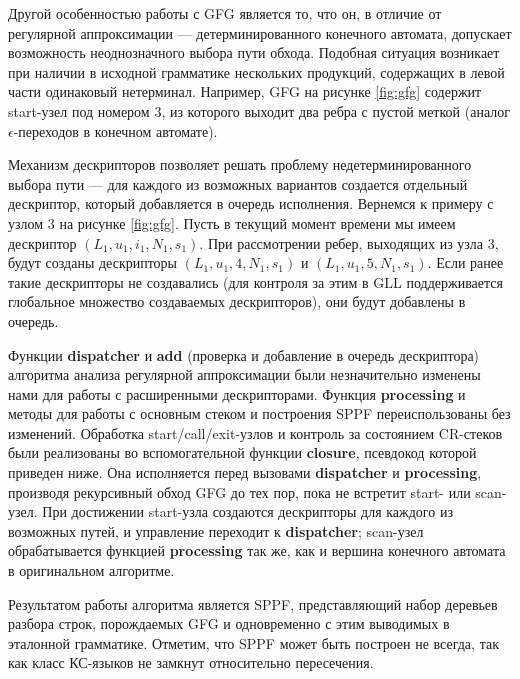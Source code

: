 Другой особенностью работы с GFG является то, что он, в отличие от регулярной аппроксимации --- детерминированного конечного автомата, допускает возможность неоднозначного выбора пути обхода. 
Подобная ситуация возникает при наличии в исходной грамматике нескольких продукций, содержащих в левой части одинаковый нетерминал. 
Например, GFG на рисунке \ref{fig:gfg} содержит start-узел под номером 3, из которого выходит два ребра с пустой меткой (аналог $\epsilon$-переходов в конечном автомате).

Механизм дескрипторов позволяет решать проблему недетерминированного выбора пути --- для каждого из возможных вариантов создается отдельный дескриптор, который добавляется в очередь исполнения. 
Вернемся к примеру с узлом 3 на рисунке \ref{fig:gfg}. Пусть в текущий момент времени мы имеем дескриптор $(L_1, u_1, i_1, N_1, s_1)$. 
При рассмотрении ребер, выходящих из узла 3, будут созданы дескрипторы $(L_1, u_1, 4, N_1, s_1)$ и $(L_1, u_1, 5, N_1, s_1)$. Если ранее такие дескрипторы не создавались (для контроля за этим в GLL поддерживается глобальное множество создаваемых дескрипторов), они будут добавлены в очередь.

Функции \textbf{dispatcher} и \textbf{add} (проверка и добавление в очередь дескриптора) алгоритма анализа регулярной аппроксимации были незначительно изменены нами для работы с расширенными дескрипторами. 
Функция \textbf{processing} и методы для работы с основным стеком и построения SPPF переиспользованы без изменений.
Обработка start/call/exit-узлов и контроль за состоянием CR-стеков были реализованы во вспомогательной функции \textbf{closure}, псевдокод которой приведен ниже.
Она исполняется перед вызовами \textbf{dispatcher} и \textbf{processing}, производя рекурсивный обход GFG до тех пор, пока не встретит start- или scan-узел. 
При достижении start-узла создаются дескрипторы для каждого из возможных путей, и управление переходит к \textbf{dispatcher};
scan-узел обрабатывается функцией \textbf{processing} так же, как и вершина конечного автомата в оригинальном алгоритме.



Результатом работы алгоритма является SPPF, представляющий набор деревьев разбора строк, порождаемых GFG и одновременно с этим выводимых в эталонной грамматике.
Отметим, что SPPF может быть построен не всегда, так как класс КС-языков не замкнут относительно пересечения.